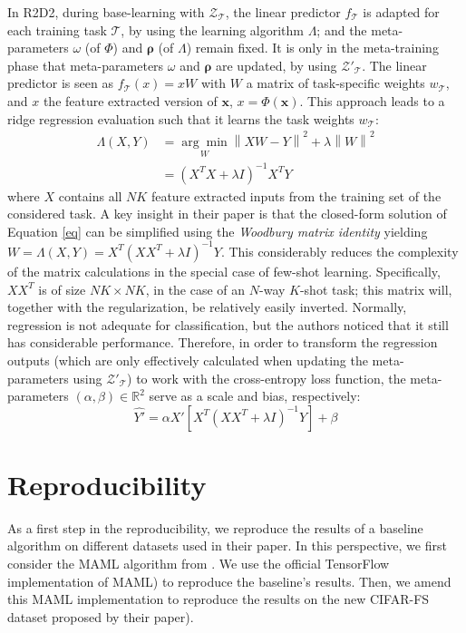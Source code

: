 In R2D2, during base-learning with $\mathcal{Z}_\mathcal{T}$, the linear predictor $f_\mathcal{T}$ is adapted for each training task $\mathcal{T}$, by using the learning algorithm $\Lambda$; and the meta-parameters $\omega$ (of $\Phi$) and $\bm{\rho}$ (of $\Lambda$) remain fixed. It is only in the meta-training phase that meta-parameters $\omega$ and $\bm{\rho}$ are updated, by using $\mathcal{Z}'_\mathcal{T}$. The linear predictor is seen as $f_\mathcal{T}(x)=xW$ with $W$ a matrix of task-specific weights $w_\mathcal{T}$, and $x$ the feature extracted version of $\bm{x}$, $x = \Phi(\bm{x})$. This approach leads to a ridge regression evaluation such that it learns the task weights  $w_\mathcal{T}$:
\newcommand{\norm}[1]{\left\lVert#1\right\rVert}
\begin{align}
\Lambda(X,Y) &= \underset{W}{\arg\min} \norm{XW-Y}^2 + \lambda\norm{W}^2 \\
&= (X^TX+\lambda I)^{-1}X^TY \label{eq}
\end{align}
where $X$ contains all $NK$ feature extracted inputs from the training set of the considered task. A key insight in their paper is that the closed-form solution of Equation \ref{eq} can be simplified using the \textit{Woodbury matrix identity} yielding $W = \Lambda(X,Y) = X^T(XX^T+\lambda I)^{-1}Y$. This considerably reduces the complexity of the matrix calculations in the special case of few-shot learning. Specifically, $XX^T$ is of size $NK\times NK$, in the case of an $N$-way $K$-shot task; this matrix will, together with the regularization, be relatively easily inverted. Normally, regression is not adequate for classification, but the authors noticed that it still has considerable performance. Therefore, in order to transform the regression outputs (which are only effectively calculated when updating the meta-parameters using $\mathcal{Z}'_\mathcal{T}$)  to work with the cross-entropy loss function, the meta-parameters $(\alpha, \beta) \in \mathbb{R}^2$ serve as a scale and bias, respectively:
\begin{equation}
\hat{Y'} = \alpha X'\left[ X^T(XX^T+\lambda I)^{-1} Y\right] + \beta
\label{wood}
\end{equation}

\section{Reproducibility}
\label{repro}
As a first step in the reproducibility, we reproduce the results of a baseline algorithm on different datasets used in their paper. In this perspective, we first consider the MAML algorithm from \citet{finn}. We use the official TensorFlow implementation of MAML\supercite{MAML}) to reproduce the baseline's results. Then, we amend this MAML implementation to reproduce the results on the new \textsc{CIFAR-FS} dataset proposed by their paper\supercite{R2D2}).


